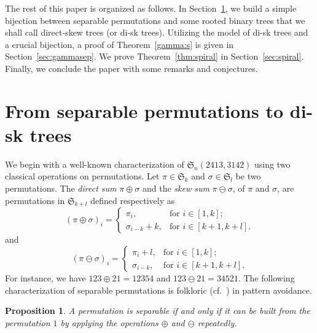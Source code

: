 \documentclass[12pt]{amsart}
\numberwithin{equation}{section}
\theoremstyle{plain}
\newtheorem{proposition}[theorem]{Proposition}
\theoremstyle{definition}
\def\S{\mathfrak{S}}
\begin{document}
 

The rest of this paper is organized as follows. In Section~\ref{sec:spswdt}, we build a simple bijection between separable permutations and some rooted binary trees that we shall call direct-skew trees (or di-sk trees).  Utilizing the model of di-sk trees and a crucial bijection, a proof of Theorem~\ref{gamma:s} is given in Section~\ref{sec:gammasep}.  
We prove Theorem~\ref{thm:spiral} in Section~\ref{sec:spiral}. Finally, we conclude the paper with some remarks and conjectures.





\section{From separable permutations to di-sk trees}\label{sec:spswdt}


















We begin with a well-known characterization of $\S_n(2413,3142)$ using two classical operations on permutations. Let   $\pi\in\S_k$ and $\sigma\in\S_l$ be two permutations. 
The \emph{direct sum} $\pi\oplus\sigma$ and the \emph{skew sum} $\pi\ominus\sigma$, of $\pi$ and $\sigma$, are permutations in $\S_{k+l}$ defined respectively as
$$
(\pi\oplus\sigma)_i=
\begin{cases}
\pi_i, &\text{for $i\in[1,k]$};\\
\sigma_{i-k}+k, &\text{for $i\in[k+1,k+l]$}.
\end{cases}
$$
and
$$
(\pi\ominus\sigma)_i=
\begin{cases}
\pi_i+l, &\text{for $i\in[1,k]$};\\
\sigma_{i-k}, &\text{for $i\in[k+1,k+l]$}.
\end{cases}
$$
 For instance, we have $123\oplus 21=12354$ and $123\ominus 21=34521$. The following  characterization of separable permutations is  folkloric  (cf.~\cite[page 57]{ki}) in pattern avoidance. 


 

 
 \begin{proposition}\label{desides}
 A permutation is separable if and only if it can be built from the permutation $1$ by applying the operations $\oplus$ and $\ominus$ repeatedly. 
 \end{proposition}
 
\end{document}
